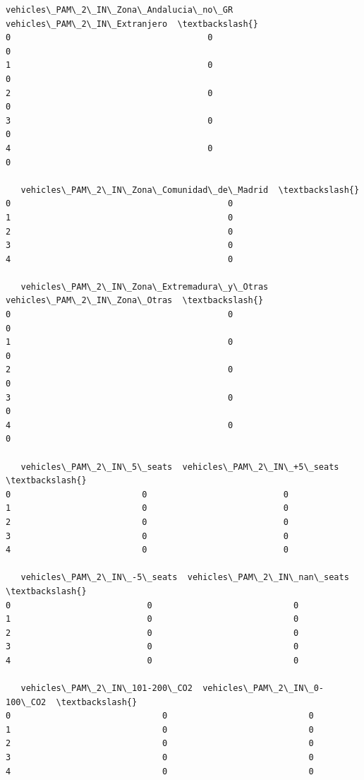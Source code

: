 \documentclass[11pt]{article}
\begin{document}
\begin{tcolorbox}[breakable, size=fbox, boxrule=.5pt, pad at break*=1mm, opacityfill=0]
\begin{Verbatim}[commandchars=\\\{\}]
   vehicles\_PAM\_2\_IN\_Zona\_Andalucia\_no\_GR  vehicles\_PAM\_2\_IN\_Extranjero  \textbackslash{}
0                                       0                             0
1                                       0                             0
2                                       0                             0
3                                       0                             0
4                                       0                             0

   vehicles\_PAM\_2\_IN\_Zona\_Comunidad\_de\_Madrid  \textbackslash{}
0                                           0
1                                           0
2                                           0
3                                           0
4                                           0

   vehicles\_PAM\_2\_IN\_Zona\_Extremadura\_y\_Otras  vehicles\_PAM\_2\_IN\_Zona\_Otras  \textbackslash{}
0                                           0                             0
1                                           0                             0
2                                           0                             0
3                                           0                             0
4                                           0                             0

   vehicles\_PAM\_2\_IN\_5\_seats  vehicles\_PAM\_2\_IN\_+5\_seats  \textbackslash{}
0                          0                           0
1                          0                           0
2                          0                           0
3                          0                           0
4                          0                           0

   vehicles\_PAM\_2\_IN\_-5\_seats  vehicles\_PAM\_2\_IN\_nan\_seats  \textbackslash{}
0                           0                            0
1                           0                            0
2                           0                            0
3                           0                            0
4                           0                            0

   vehicles\_PAM\_2\_IN\_101-200\_CO2  vehicles\_PAM\_2\_IN\_0-100\_CO2  \textbackslash{}
0                              0                            0
1                              0                            0
2                              0                            0
3                              0                            0
4                              0                            0


\end{Verbatim}
\end{tcolorbox}
\end{document}

